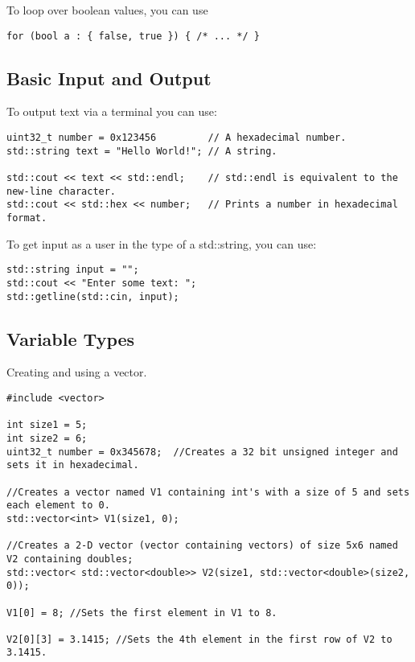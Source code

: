 To loop over boolean values, you can use
\begin{lstlisting}
for (bool a : { false, true }) { /* ... */ }
\end{lstlisting}








\subsection{Basic Input and Output}
To output text via a terminal you can use:
\begin{lstlisting}
uint32_t number = 0x123456         // A hexadecimal number.
std::string text = "Hello World!"; // A string.

std::cout << text << std::endl;    // std::endl is equivalent to the new-line character.
std::cout << std::hex << number;   // Prints a number in hexadecimal format.
\end{lstlisting}

To get input as a user in the type of a std::string, you can use:
\begin{lstlisting}
std::string input = "";
std::cout << "Enter some text: ";
std::getline(std::cin, input);
\end{lstlisting}











\subsection{Variable Types}

Creating and using a vector.
\begin{lstlisting}
#include <vector>

int size1 = 5;
int size2 = 6;
uint32_t number = 0x345678;  //Creates a 32 bit unsigned integer and sets it in hexadecimal.

//Creates a vector named V1 containing int's with a size of 5 and sets each element to 0. 
std::vector<int> V1(size1, 0); 

//Creates a 2-D vector (vector containing vectors) of size 5x6 named V2 containing doubles;
std::vector< std::vector<double>> V2(size1, std::vector<double>(size2, 0)); 

V1[0] = 8; //Sets the first element in V1 to 8.

V2[0][3] = 3.1415; //Sets the 4th element in the first row of V2 to 3.1415.
\end{lstlisting}








